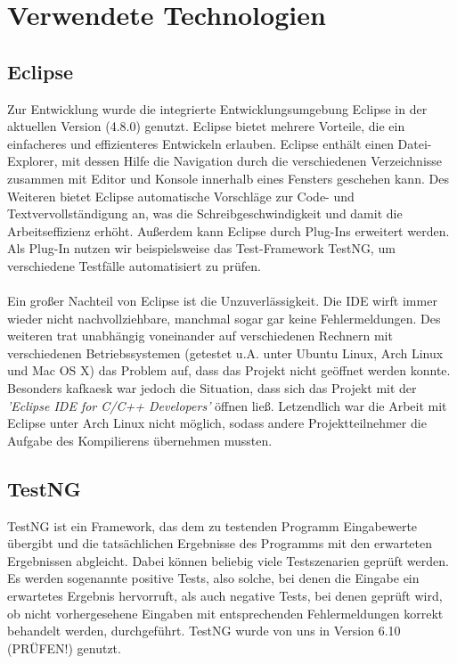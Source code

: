 
\section{Verwendete Technologien}

\subsection{Eclipse}
Zur Entwicklung wurde die integrierte Entwicklungsumgebung Eclipse in der aktuellen Version (4.8.0) genutzt. 
Eclipse bietet mehrere Vorteile, die ein einfacheres und effizienteres Entwickeln erlauben. Eclipse enthält einen Datei-Explorer, mit dessen Hilfe die Navigation durch die verschiedenen Verzeichnisse zusammen mit Editor und Konsole innerhalb eines Fensters geschehen kann. Des Weiteren bietet Eclipse automatische Vorschläge zur Code- und Textvervollständigung an, was die Schreibgeschwindigkeit und damit die Arbeitseffizienz erhöht. 
Außerdem kann Eclipse durch Plug-Ins erweitert werden. Als Plug-In nutzen wir beispielsweise das Test-Framework TestNG, um verschiedene Testfälle automatisiert zu prüfen.
\\\\
Ein großer Nachteil von Eclipse ist die Unzuverlässigkeit. Die IDE wirft immer wieder nicht nachvollziehbare, manchmal sogar gar keine Fehlermeldungen. Des weiteren trat unabhängig voneinander auf verschiedenen Rechnern mit verschiedenen Betriebssystemen (getestet u.A. unter Ubuntu Linux, Arch Linux und Mac OS X) das Problem auf, dass das Projekt nicht geöffnet werden konnte. Besonders kafkaesk war jedoch die Situation, dass sich das Projekt mit der \textit{'Eclipse IDE for C/C++ Developers'} öffnen ließ. Letzendlich war die Arbeit mit Eclipse unter Arch Linux nicht möglich, sodass andere Projektteilnehmer die Aufgabe des Kompilierens übernehmen mussten.

\subsection{TestNG}
TestNG ist ein Framework, das dem zu testenden Programm Eingabewerte übergibt und die tatsächlichen Ergebnisse des Programms mit den erwarteten Ergebnissen abgleicht. Dabei können beliebig viele Testszenarien geprüft werden. Es werden sogenannte positive Tests, also solche, bei denen die Eingabe ein erwartetes Ergebnis hervorruft, als auch negative Tests, bei denen geprüft wird, ob nicht vorhergesehene Eingaben mit entsprechenden Fehlermeldungen korrekt behandelt werden, durchgeführt. TestNG wurde von uns in Version 6.10 (PRÜFEN!) genutzt.


